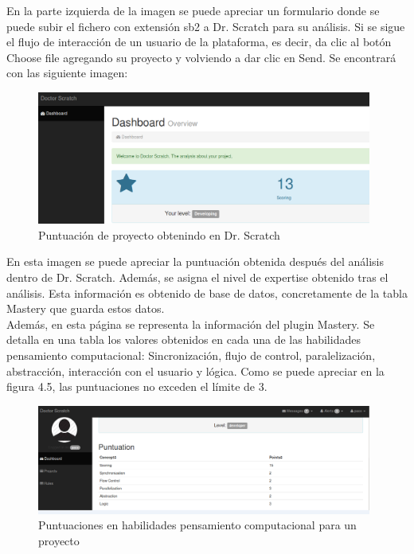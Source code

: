 \documentclass[a4paper, 12pt]{book}
\begin{document}
En la parte izquierda de la imagen se puede apreciar un formulario donde se puede
subir el fichero con extensión sb2 a Dr. Scratch para su análisis. Si se sigue el
flujo de interacción de un usuario de la plataforma, es decir, da clic al botón
 Choose file agregando su proyecto y volviendo a dar clic en Send. Se encontrará 
con las siguiente imagen:

 \begin{figure}
		\graphicspath{{img/}}
    \includegraphics[bb=0 0 800 600, width=11cm, keepaspectratio]{puntuacion.png}
		\caption{Puntuación de proyecto obtenindo en Dr. Scratch}
    \label{figura:foro_hilos}
 \end{figure} 

En esta imagen se puede apreciar la puntuación obtenida después del análisis dentro
de Dr. Scratch. Además, se asigna el nivel de expertise obtenido tras el análisis.
Esta información es obtenido de base de datos, concretamente de la tabla Mastery que
guarda estos datos. \\

Además, en esta página se representa la información del plugin Mastery. Se detalla
en una tabla los valores obtenidos en cada una de las habilidades pensamiento
computacional: Sincronización, flujo de control, paralelización, abstracción,
interacción con el usuario y lógica. Como se puede apreciar en la figura 4.5, las
puntuaciones no exceden el límite de 3. 

\begin{figure}
	\graphicspath{{img/}}
  \includegraphics[bb=0 0 800 600, width=11cm, keepaspectratio]{scoring.png}
	\caption{Puntuaciones en habilidades pensamiento computacional para un proyecto}
  \label{figura:foro_hilos}
\end{figure}
\end{document}

